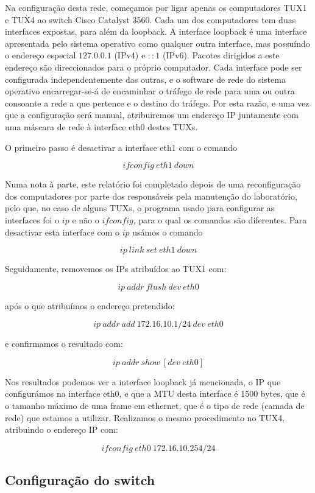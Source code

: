 \documentclass[a4paper,11pt,titlepage]{article}
\begin{document}
Na configuração desta rede, começamos por ligar apenas os computadores TUX1 e
TUX4 ao switch Cisco Catalyst 3560. Cada um dos computadores tem duas
interfaces expostas, para além da loopback.
A interface loopback é uma interface apresentada pelo sistema operativo como
qualquer outra interface, mas possuíndo o endereço especial $127.0.0.1$
(IPv4) e $::1$ (IPv6). Pacotes dirigidos a este endereço são direccionados para o
próprio computador.
Cada interface pode ser configurada independentemente das outras, e o software
de rede do sistema operativo encarregar-se-á de encaminhar o tráfego de rede
para uma ou outra consoante a rede a que pertence e o destino do tráfego. Por esta razão, e uma vez que a configuração será manual, atribuiremos um endereço IP
juntamente com uma máscara de rede à interface eth0 destes TUXs.

O primeiro passo é desactivar a interface eth1 com o comando

$$ifconfig\ eth1\ down$$

Numa nota à parte, este relatório foi completado depois de uma
reconfiguração dos computadores por parte dos responsáveis pela manutenção do
laboratório, pelo que, no caso de alguns TUXs, o programa usado para configurar
as interfaces foi o $ip$ e não o $ifconfig$, para o qual os comandos são
diferentes. Para desactivar esta interface com o $ip$ usámos o comando

$$ip\ link\ set\ eth1\ down$$

Seguidamente, removemos os IPs atribuídos ao TUX1 com:

$$ip\ addr\ flush\ dev\ eth0$$

após o que atribuímos o endereço pretendido:

$$ip\ addr\ add\ 172.16.10.1/24\ dev\ eth0$$

e confirmamos o resultado com:

$$ip\ addr\ show\ [dev\ eth0]$$

Nos resultados podemos ver a interface loopback já mencionada, o IP que
configurámos na interface eth0, e que a MTU desta interface é 1500 bytes, que é
o tamanho máximo de uma frame em ethernet, que é o tipo de rede (camada de
rede) que estamos a utilizar.
Realizamos o mesmo procedimento no TUX4, atribuindo o endereço IP com:

$$ifconfig\ eth0\ 172.16.10.254/24$$

\subsection*{Configuração do switch}
\end{document}
